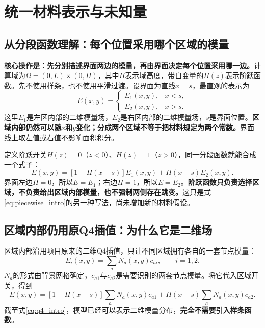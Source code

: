 \documentclass[11pt,a4paper]{ctexart}
\begin{document}
\section{统一材料表示与未知量}
\subsection{从分段函数理解：每个位置采用哪个区域的模量}
\label{sec:intuitive}
\textbf{核心操作是：先分别描述界面两边的模量，再由界面决定每个位置采用哪一边。}计算域为$\Omega=(0,L)\times(0,H)$，其中$H$表示域高度，带自变量的$H(z)$表示阶跃函数。先不使用样条，也不使用平滑过渡。设界面为直线$x=s$，最直观的表示为
\begin{equation}
 E(x,y)=\begin{cases}
 E_1(x,y),&x<s,\\
 E_2(x,y),&x>s.
 \end{cases}
 \label{eq:piecewise_intro}
\end{equation}
这里$E_1$是左区内部的二维模量场，$E_2$是右区内部的二维模量场，$s$是界面位置。\textbf{区域内部仍然可以随$x$和$y$变化；分成两个区域不等于把材料规定为两个常数。}界面线上取左值或右值不影响面积积分。

定义阶跃开关$H(z)=0$（$z<0$）、$H(z)=1$（$z>0$），同一分段函数就能合成一个式子：
\begin{equation}
 \boxed{E(x,y)=[1-H(x-s)]E_1(x,y)+H(x-s)E_2(x,y).}
 \label{eq:sharp_intro}
\end{equation}
界面左边$H=0$，所以$E=E_1$；右边$H=1$，所以$E=E_2$。\textbf{阶跃函数只负责选择区域，不负责给出区域内部模量，也不强制两侧存在跳变。}这只是式\eqref{eq:piecewise_intro}的另一种写法，尚未增加新的材料假设。

\subsection{区域内部仍用原Q4插值：为什么它是二维场}
\label{sec:q4_2d}
区域内部沿用项目原来的二维Q4插值，只让不同区域拥有各自的一套节点模量：
\begin{equation}
 E_i(x,y)=\sum_aN_a(x,y)c_{ai},\qquad i=1,2.
 \label{eq:branches}
\end{equation}
$N_a$的形式由背景网格确定，$c_{a1}$与$c_{a2}$是需要识别的两套节点模量。将它代入区域开关，得到
\begin{equation}
 \boxed{E(x,y)=[1-H(x-s)]\sum_aN_a(x,y)c_{a1}
                    +H(x-s)\sum_aN_a(x,y)c_{a2}.}
 \label{eq:q4_intro}
\end{equation}
截至式\eqref{eq:q4_intro}，模型已经可以表示二维模量分布，\textbf{完全不需要引入样条函数}。
\end{document}
